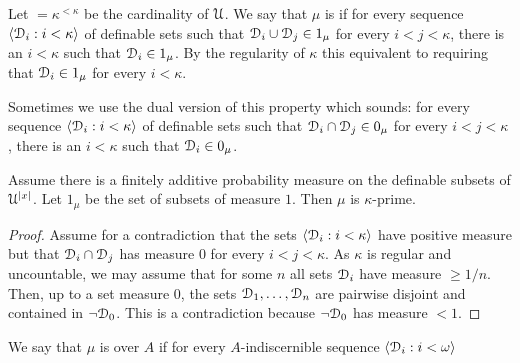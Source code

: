 \documentclass{amsproc}
\renewcommand*{\emph}[1]{%
   \smash{\tikz[baseline]\node[rectangle, fill=teal!25, rounded corners, inner xsep=0.5ex, inner ysep=0.2ex, anchor=base, minimum height = 2.7ex]{\strut #1};}}
\begin{document}

Let \emph{$\kappa$}$=\kappa^{<\kappa}$ be the cardinality of $\EuScript U$.
We say that $\mu$ is \emph{$\kappa$-prime} if for every sequence $\langle\EuScript D_i:i<\kappa\rangle$ of definable sets such that $\EuScript D_i\cup \EuScript D_j\in1_\mu$ for every $i<j<\kappa$, there is an $i<\kappa$ such that $\EuScript D_i\in1_\mu$.
By the regularity of $\kappa$ this equivalent to requiring that  $\EuScript D_i\in1_\mu$ for every $i<\kappa$.

Sometimes we use the dual version of this property which sounds: for every sequence $\langle\EuScript D_i:i<\kappa\rangle$ of definable sets such that $\EuScript D_i\cap \EuScript D_j\in0_\mu$ for every $i<j<\kappa$, there is an $i<\kappa$ such that $\EuScript D_i\in0_\mu$.

\begin{example}
  Assume there is a finitely additive probability measure on the definable subsets of $\EuScript U^{|x|}$.
  Let $1_\mu$ be the set of subsets of measure $1$.
  Then $\mu$ is $\kappa$-prime.
\end{example}

\begin{proof}
  Assume for a contradiction that the sets $\langle\EuScript D_i:i<\kappa\rangle$ have positive measure but that $\EuScript D_i\cap \EuScript D_j$ has measure $0$ for every $i<j<\kappa$.
  As $\kappa$ is regular and uncountable, we may assume that for some $n$ all sets $\EuScript D_i$ have measure $\ge 1/n$.
  Then, up to a set measure $0$, the sets $\EuScript D_1,\dots,\EuScript D_n$ are pairwise disjoint and contained in $\neg\EuScript D_0$.
  This is a contradiction because $\neg\EuScript D_0$ has measure $<1$.
\end{proof}

We say that $\mu$ is \emph{S1\/} over $A$ if for every $A$-indiscernible sequence $\langle\EuScript D_i:i<\omega\rangle$
    
\def\ceq#1#2#3{\parbox[t]{25ex}{$\displaystyle #1$}\parbox{6ex}{\hfil $#2$}{$\displaystyle #3$}}
\end{document}
